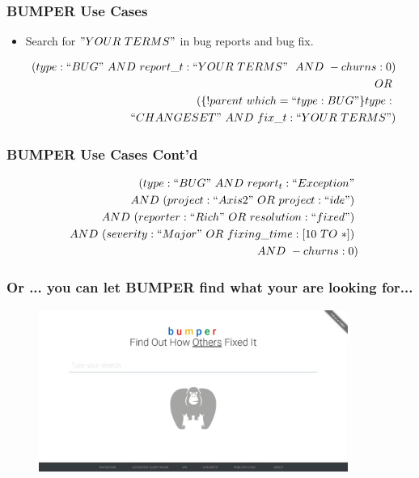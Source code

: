 \documentclass{beamer}
\begin{document}
\begin{frame}

  \frametitle{BUMPER Use Cases}

\begin{itemize}
  \item Search for $"YOUR~TERMS"$ in bug reports and bug fix.
\end{itemize}

  \begin{equation*}
  \begin{split}
  ~~(type:``BUG"~AND~report\_t:``YOUR~TERMS"~~AND~-churns:0)\\
  ~~OR~\\
  ~~(\{!parent~which=``type:BUG"\}type:~\\
  ~~``CHANGESET"~AND~fix\_t:``YOUR~TERMS")
  \end{split}
  \end{equation*}

\end{frame}

\begin{frame}

  \frametitle{BUMPER Use Cases Cont'd}


  \begin{equation*}
  \begin{split}
    (type:``BUG"~AND~report_t:``Exception"~\\
  ~~AND~(project:``Axis2"~OR~project:``ide")~\\
  ~~AND~(reporter:``Rich"~OR~resolution:``fixed")~\\
  ~~AND~(severity:``Major"~OR~fixing\_time:[10~TO~*])~\\
  ~~AND~-churns:0)
  \end{split}
  \end{equation*}


\end{frame}

\begin{frame}

  \frametitle{Or ... you can let BUMPER find what your are looking for...}

  \begin{figure}
    \centering
    \includegraphics[width=0.9\textwidth]{../media/interface.png}
  \vspace{-1.8em}
  \end{figure}

\end{frame}
\end{document}
